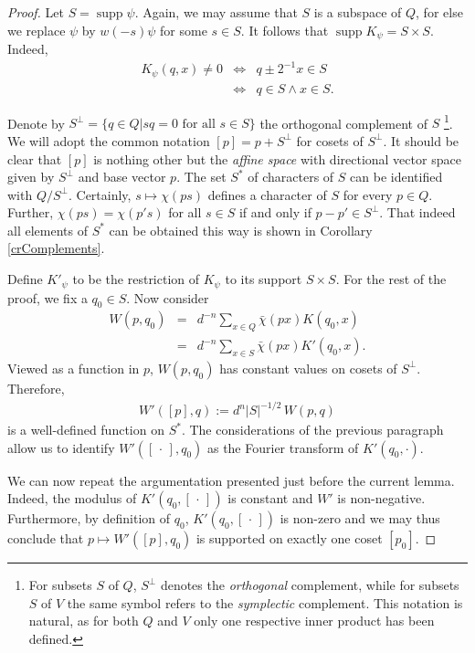 \documentclass[aps,twocolumn,floatfix]{revtex4}
\def\spacedot{\,\cdot\,}
\DeclareMathOperator{\supp}{supp}
\begin{document}
\begin{proof}
	Let $S=\supp\psi$. Again, we may assume that $S$ is a subspace of
	$Q$, for else we replace $\psi$ by $w(-s)\psi$ for some $s\in S$.
	It follows that $\supp K_\psi = S\times S$. Indeed, 
	\begin{eqnarray*}
		K_\psi(q,x) \neq 0 
		&\Leftrightarrow& q\pm 2^{-1}x \in S \\
		&\Leftrightarrow& q \in S \wedge x \in S.
	\end{eqnarray*}
	
	Denote by $S^\bot=\{q\in Q| sq =0 \text{ for all } s\in S\}$ the
	orthogonal complement of $S$
	\footnote{
		For subsets $S$ of $Q$, $S^\bot$ denotes the \emph{orthogonal}
		complement, while for subsets $S$ of $V$ the same symbol refers to
		the \emph{symplectic} complement. This notation is natural, as for
		both $Q$ and $V$ only one respective inner product has been
		defined. 
	}.  
	We will adopt the common notation $[p]=p+S^\bot$ for cosets of
	$S^\bot$. It should be clear that $[p]$ is nothing other but the
	\emph{affine space} with directional vector space given by $S^\bot$
	and base vector $p$. The set $S^*$ of characters of $S$ can be
	identified with $Q/S^\bot$. Certainly, $s \mapsto \chi(ps)$ defines
	a character of $S$ for every $p\in Q$.  Further,
	$\chi(ps)=\chi(p's)$ for all $s\in S$ if and only if $p-p'\in
	S^\bot$. That indeed all elements of $S^*$ can be obtained this way
	is shown in Corollary \ref{crComplements}.

	Define $K'_\psi$ to be the restriction of $K_\psi$ to its support
	$S\times S$. For the rest of the proof, we fix a $q_0\in S$. Now consider 
	\begin{eqnarray*}
		W(p,q_0)
		&=& d^{-n} \sum_{x\in Q} \bar\chi(px) K(q_0,x) \\
		&=& d^{-n} \sum_{x\in S} \bar\chi(px) K'(q_0,x).
	\end{eqnarray*}
	Viewed as a function in $p$, $W(p,q_0)$ has constant values on
	cosets of $S^\bot$.  Therefore, 
	\begin{eqnarray}\label{reducedTransform}
		W'([p],q):=d^n|S|^{-1/2}\,W(p,q)
	\end{eqnarray}
	is a well-defined function on $S^*$. The considerations of the
	previous paragraph allow us to identify $W'([\spacedot],q_0)$ as the
	Fourier transform of $K'(q_0,\cdot)$. 

	We can now repeat the argumentation presented just before the
	current lemma. Indeed, the modulus of $K'(q_0,[\spacedot])$ is
	constant and $W'$ is non-negative. Furthermore, by definition of
	$q_0$, $K'(q_0,[\spacedot])$ is non-zero and we may thus conclude that
	$p\mapsto W'([p],q_0)$ is supported on exactly one coset $[p_0]$.


\end{proof}
\end{document}
